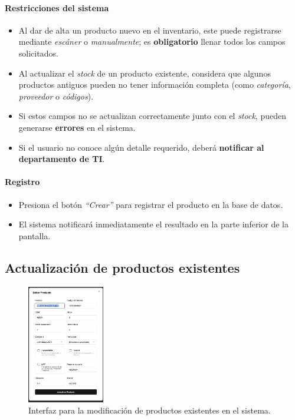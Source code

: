 \paragraph{Restricciones del sistema}

\begin{itemize}
  \item Al dar de alta un producto nuevo en el inventario, este puede registrarse mediante \emph{escáner} o \emph{manualmente}; es \textbf{obligatorio} llenar todos los campos solicitados.
  \item Al actualizar el \emph{stock} de un producto existente, considera que algunos productos antiguos pueden no tener información completa (como \emph{categoría}, \emph{proveedor} o \emph{códigos}). 
  \item Si estos campos no se actualizan correctamente junto con el \emph{stock}, pueden generarse \textbf{errores} en el sistema.
  \item Si el usuario no conoce algún detalle requerido, deberá \textbf{notificar al departamento de TI}.
\end{itemize}


\paragraph{Registro}

\begin{itemize}
  \item Presiona el botón \emph{“Crear”} para registrar el producto en la base de datos.
  \item El sistema notificará inmediatamente el resultado en la parte inferior de la pantalla.
\end{itemize}

 
\subsection{Actualización de productos existentes}

\begin{figure}[H]
\centering
\includegraphics[width=0.3\textwidth]{imgs/Almacen_General/inventario/inventario_editar.png}
\caption{Interfaz para la modificación de productos existentes en el sistema.}
\label{fig:modificarProducto}
\end{figure}

